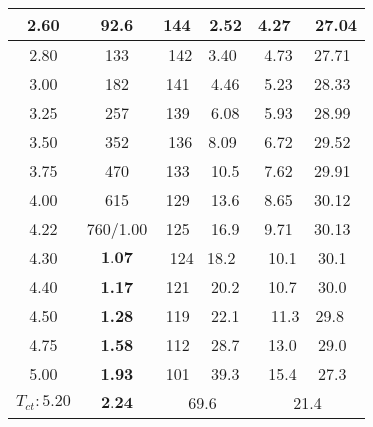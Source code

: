 \begin{table}[htbp]
\begin{tabular}{|c|c|c|c|}
2.60 & 92.6 & 144\ \ 2.52 & 4.27 \ \ 27.04 \\ \hline
2.80 & 133 & 142\ \ 3.40 & 4.73 \ \ 27.71 \\ \hline
3.00 & 182 & 141 \ \ 4.46 & 5.23 \ \ 28.33 \\ \hline
3.25 & 257 & 139 \ \ 6.08 & 5.93 \ \ 28.99 \\ \hline
3.50 & 352 & 136\ \ 8.09 & 6.72 \ \ 29.52 \\ \hline
3.75 & 470 & 133 \ \ 10.5 & 7.62 \ \ 29.91 \\ \hline
4.00 & 615 & 129 \ \ 13.6 & 8.65 \ \ 30.12 \\ \hline
4.22 & 760/1.00 & 125 \ \ 16.9 & 9.71 \ \ 30.13 \\ \hline
4.30 & $\textbf{1.07}$ & 124 \ 18.2 & 10.1 \ \ 30.1 \\ \hline
4.40 & \textbf{1.17} & 121 \ \ 20.2 & 10.7 \ \ 30.0 \\ \hline
4.50 & \textbf{1.28} & 119 \ \ 22.1 & 11.3\ \ 29.8 \\ \hline
4.75 & \textbf{1.58} & 112 \ \ 28.7 & 13.0 \ \ 29.0 \\ \hline
5.00 & \textbf{1.93} & 101 \ \ 39.3 & 15.4 \ \ 27.3 \\ \hline
$T_{ct}:5.20$ & $\textbf{2.24}$ & 69.6 & 21.4 \\ \hline
\end{tabular}
\end{table}


